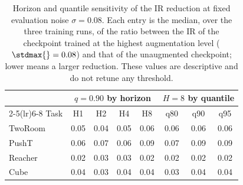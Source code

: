 \begin{table}[H]
\centering
\caption{Horizon and quantile sensitivity of the IR reduction at fixed evaluation noise $\sigma=0.08$. Each entry is the median, over the three training runs, of the ratio between the IR of the checkpoint trained at the highest augmentation level ($\stdmax{}=0.08$) and that of the unaugmented checkpoint; lower means a larger reduction. These values are descriptive and do not retune any threshold.}
\label{tab:horizon-quantile-sensitivity}
\small
\setlength{\tabcolsep}{5pt}
\begin{tabular}{lccccccc}
\toprule
& \multicolumn{4}{c}{$q=0.90$ by horizon} & \multicolumn{3}{c}{$H=8$ by quantile} \\
\cmidrule(lr){2-5}\cmidrule(lr){6-8}
Task & H1 & H2 & H4 & H8 & q80 & q90 & q95 \\
\midrule
TwoRoom & 0.05 & 0.04 & 0.05 & 0.06 & 0.06 & 0.06 & 0.06 \\
PushT & 0.06 & 0.07 & 0.06 & 0.09 & 0.07 & 0.09 & 0.09 \\
Reacher & 0.02 & 0.03 & 0.03 & 0.02 & 0.02 & 0.02 & 0.02 \\
Cube & 0.04 & 0.03 & 0.04 & 0.04 & 0.03 & 0.04 & 0.04 \\
\bottomrule
\end{tabular}
\end{table}
